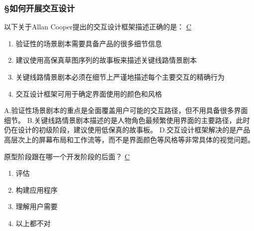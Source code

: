 \subsubsection*{\S 如何开展交互设计}
\setcounter{problemname}{0}

\begin{problem}
	以下关于Allan Cooper提出的交互设计框架描述正确的是：
	\uline{C}    
        \begin{enumerate}[label=\Alph*.]
            \item 验证性的场景剧本需要具备产品的很多细节信息
            \item 建议使用高保真草图序列的故事板来描述关键线路情景剧本
            \item 关键线路情景剧本必须在细节上严谨地描述每个主要交互的精确行为
            \item 交互设计框架可用于确定界面使用的颜色和风格
        \end{enumerate}
\end{problem}

\begin{solution}
A.验证性场景剧本的重点是全面覆盖用户可能的交互路径，但不用具备很多界面细节。  B.关键线路情景剧本描述的是人物角色最频繁使用界面的主要路径，此时仍在设计的初级阶段，建议使用低保真的故事板。  D.交互设计框架解决的是产品高层次上的屏幕布局和工作流等，而不是界面颜色等风格等非常具体的视觉问题。
\end{solution}


\begin{problem}
	原型阶段跟在哪一个开发阶段的后面？
	\uline{C}    
    \vspace{-0.8em}
    \begin{multicols}{4}
        \begin{enumerate}[label=\Alph*.]
            \item 评估
            \item 构建应用程序
            \item 理解用户需要
            \item 以上都不对
        \end{enumerate}
    \end{multicols}
    \vspace{-1em}
\end{problem}

